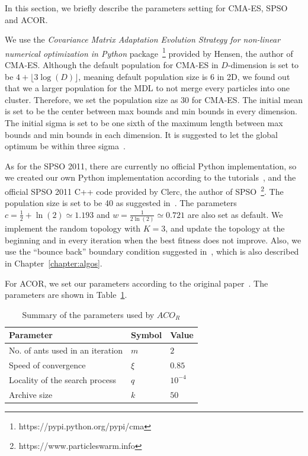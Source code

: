 In this section, we briefly describe the parameters setting for CMA-ES, SPSO and ACOR.

We use the \textit{Covariance Matrix Adaptation Evolution Strategy for non-linear numerical optimization in Python} package~\footnote{https://pypi.python.org/pypi/cma} provided by Hensen, the author of CMA-ES.
Although the default population for CMA-ES in $D$-dimension is set to be $4 + \lfloor3\log(D)\rfloor$, meaning default population size is 6 in 2D,
we found out that we a larger population for the MDL to not merge every particles into one cluster.
Therefore, we set the population size as 30 for CMA-ES.
The initial mean is set to be the center between max bounds and min bounds in every dimension.
The initial sigma is set to be one sixth of the maximum length between max bounds and min bounds in each dimension. 
It is suggested to let the global optimum be within three sigma~\cite{Hansen:2006:CMA_ES_review}.

As for the SPSO 2011, there are currently no official Python implementation, 
so we created our own Python implementation according to the tutorials~\cite{Clerc:2012:SPSO2011},
and the official SPSO 2011 C++ code provided by Clerc, the author of SPSO~\footnote{https://www.particleswarm.info}.
The population size is set to be 40 as suggested in~\cite{Clerc:2012:SPSO2011}.
The parameters $c = \frac{1}{2} + \ln(2) \simeq 1.193$ and $w = \frac{1}{2\ln(2)} \simeq 0.721$ are also set as default.
We implement the random topology with $K = 3$,
and update the topology at the beginning and in every iteration when the best fitness does not improve.
Also, we use the ``bounce back'' boundary condition suggested in~\cite{Clerc:2012:SPSO2011}, which is also described in Chapter~\ref{chapter:algos}.

For ACOR, we set our parameters according to the original paper~\cite{Socha:2008:ACOR}. 
The parameters are shown in Table~\ref{table:ACOR_parameters}.

\begin{table}%
\centering
\label{table:ACOR_parameters}
\begin{tabular}{lll}
\hline
Parameter                        & Symbol   & Value          \\ \hline
No. of ants used in an iteration & $m$      & $2$            \\
Speed of convergence             & $\xi$    & $0.85$         \\
Locality of the search process   & $q$      & $10^{-4}$      \\
Archive size                     & $k$      & $50$           \\ \hline
\end{tabular}
\caption{Summary of the parameters used by $ACO_R$}
\end{table}

